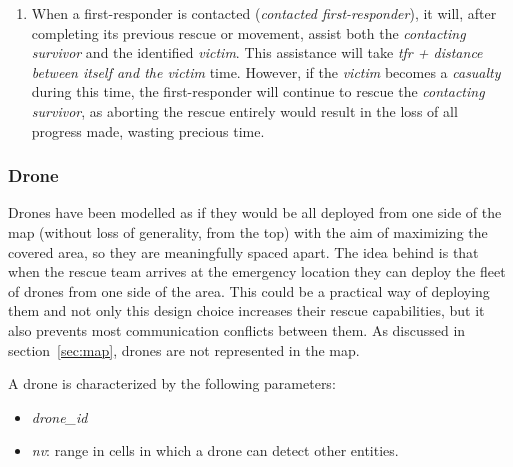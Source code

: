 \begin{enumerate}
	Furthermore, distinguishing between this committed state and the \textit{Wandering} state is essential to avoid potential deadlocks, which are also prevented by the discussed moving policy.
	
	No interactions occur when a first-responder is fatigued, as it cannot be detected by drones. To achieve this, the function \textit{fEnergyUsed} was employed during victim detection, even though this does not fully reflect real-life scenarios where the first-responder would typically become fatigued after performing an action. In this model, the first-responder is already fatigued when making the final rescue or movement.
	
	\item When a first-responder is contacted (\textit{contacted first-responder}), it will, after completing its previous rescue or movement, assist both the \textit{contacting survivor} and the identified \textit{victim}. This assistance will take \textit{tfr + distance between itself and the victim} time. However, if the \textit{victim} becomes a \textit{casualty} during this time, the first-responder will continue to rescue the \textit{contacting survivor}, as aborting the rescue entirely would result in the loss of all progress made, wasting precious time.
\end{enumerate}

\subsubsection{Drone}
\label{sec:drone}
Drones have been modelled as if they would be all deployed from one side of the map (without loss of generality, from the top) with the aim of maximizing the covered area, so they are meaningfully spaced apart. The idea behind is that when the rescue team arrives at the emergency location they can deploy the fleet of drones from one side of the area. This could be a practical way of deploying them and not only this design choice increases their rescue capabilities, but it also prevents most communication conflicts between them.\newline
As discussed in section~\ref{sec:map}, drones are not represented in the map. \newline

\noindent
A drone is characterized by the following parameters:
\begin{itemize}
	\item \textit{drone\_id}
	\item \textit{nv}: range in cells in which a drone can detect other entities.
\end{itemize}

